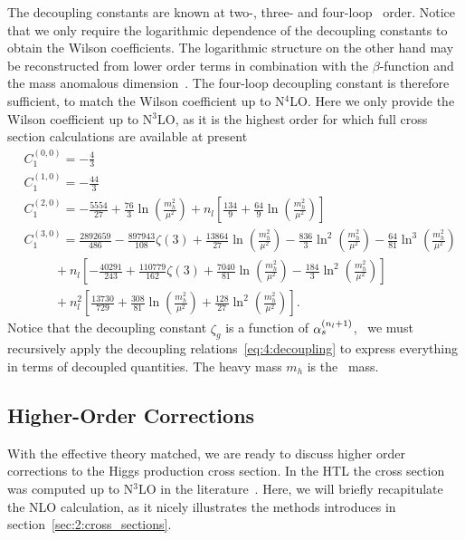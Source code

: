 The decoupling constants are known at two-, three-\cite{Chetyrkin:1997sg} and four-loop~\cite{Schroder:2005hy, Chetyrkin:2005ia} order. Notice that we only require the logarithmic dependence of the decoupling constants to obtain the Wilson coefficients. The logarithmic structure on the other hand may be reconstructed from lower order terms in combination with the $\beta$-function and the mass anomalous dimension~\cite{Chetyrkin:1997un}. The four-loop decoupling constant is therefore sufficient, to match the Wilson coefficient up to N${}^4$LO. Here we only provide the Wilson coefficient up to N${}^3$LO, as it is the highest order for which full cross section calculations are available at present
\begin{equation}
\begin{split}
&C_1^{(0,0)} = -\frac{4}{3} \\
&C_1^{(1,0)} = -\frac{44}{3} \\
&C_1^{(2,0)} = -\frac{5554}{27}  + \frac{76}{3} \ln\!\left(\frac{m_h^2}{\mu^2} \right) +  n_l \left[\frac{134}{9} + \frac{64}{9} \ln\!\left(\frac{m_h^2}{\mu^2} \right) \right] \\
&C_1^{(3,0)} = \frac{2892659}{486} - \frac{897943}{108} \zeta (3) + \frac{13864}{27} \ln\!\left(\frac{m_h^2}{\mu^2} \right) - \frac{836}{3} \ln^2\!\left(\frac{m_h^2}{\mu^2} \right) - \frac{64}{81} \ln^3\!\left(\frac{m_h^2}{\mu^2} \right) \\
& \hspace{1cm} + n_l \left[-\frac{40291}{243} + \frac{110779}{162} \zeta (3) + \frac{7040}{81} \ln\!\left(\frac{m_h^2}{\mu^2} \right) - \frac{184}{3} \ln^2\!\left(\frac{m_h^2}{\mu^2} \right) \right]    \\
& \hspace{1cm} + n_l^2 \left[ \frac{13730}{729} + \frac{308}{81} \ln\!\left(\frac{m_h^2}{\mu^2} \right) + \frac{128}{27} \ln^2\!\left(\frac{m_h^2}{\mu^2} \right) \right].
\end{split}
\end{equation}
Notice that the decoupling constant $\zeta_g$ is a function of $\alpha_s^{(n_l + 1)}$, \ie\ we must recursively apply the decoupling relations~\eqref{eq:4:decoupling} to express everything in terms of decoupled quantities. The heavy mass $m_h$ is the \MS\ mass.



\subsection{Higher-Order Corrections}
With the effective theory matched, we are ready to discuss higher order corrections to the Higgs production cross section. In the \acs{HTL} the cross section was computed up to N${}^3$LO in the literature~\cite{Dawson:1990zj, Harlander:2002wh, Anastasiou:2002yz, Anastasiou:2016cez}. Here, we will briefly recapitulate the \acs{NLO} calculation, as it nicely illustrates the methods introduces in section~\ref{sec:2:cross_sections}.

